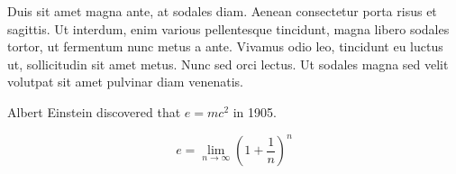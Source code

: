 \documentclass[11pt,a4paper,sans]{moderncv}        %
\begin{document}
Duis sit amet magna ante, at sodales diam. Aenean consectetur porta risus et sagittis. Ut interdum, enim various pellentesque tincidunt, magna libero sodales tortor, ut fermentum nunc metus a ante. Vivamus odio leo, tincidunt eu luctus ut, sollicitudin sit amet metus. Nunc sed orci lectus. Ut sodales magna sed velit volutpat sit amet pulvinar diam venenatis.

Albert Einstein discovered that $e=mc^2$ in 1905.

\[ e=\lim_{n \to \infty} \left(1+\frac{1}{n}\right)^n \]

\makeletterclosing

\end{document}
